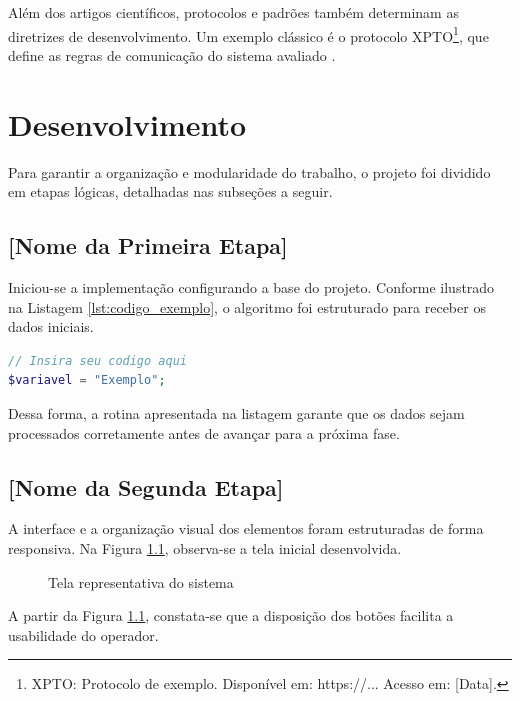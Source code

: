 \documentclass[
    12pt,
    openright,
    oneside,
    a4paper,
    english,
    french,
    spanish,
    brazil
]{abntex2}
\begin{document}
Além dos artigos científicos, protocolos e padrões também determinam as diretrizes de desenvolvimento. Um exemplo clássico é o protocolo XPTO\footnote{XPTO: Protocolo de exemplo. Disponível em: https://... Acesso em: [Data].}, que define as regras de comunicação do sistema avaliado \cite{[chave_da_referencia2]}.

\chapter{Desenvolvimento}
Para garantir a organização e modularidade do trabalho, o projeto foi dividido em etapas lógicas, detalhadas nas subseções a seguir.

\section{[Nome da Primeira Etapa]}
Iniciou-se a implementação configurando a base do projeto. Conforme ilustrado na Listagem \ref{lst:codigo_exemplo}, o algoritmo foi estruturado para receber os dados iniciais.

\begin{lstlisting}[caption={Exemplo de código fonte inicial}, label={lst:codigo_exemplo}, language=PHP]
// Insira seu codigo aqui
$variavel = "Exemplo";
\end{lstlisting}

Dessa forma, a rotina apresentada na listagem garante que os dados sejam processados corretamente antes de avançar para a próxima fase.

\section{[Nome da Segunda Etapa]}
A interface e a organização visual dos elementos foram estruturadas de forma responsiva. Na Figura \ref{fig:exemplo_interface}, observa-se a tela inicial desenvolvida.

\begin{figure}[htb]
    \centering
    \caption{Tela representativa do sistema}
    \label{fig:exemplo_interface}
    \fbox{\rule{0pt}{2in} \rule{0.8\textwidth}{0pt}} %
\end{figure}

A partir da Figura \ref{fig:exemplo_interface}, constata-se que a disposição dos botões facilita a usabilidade do operador. 
\end{document}
